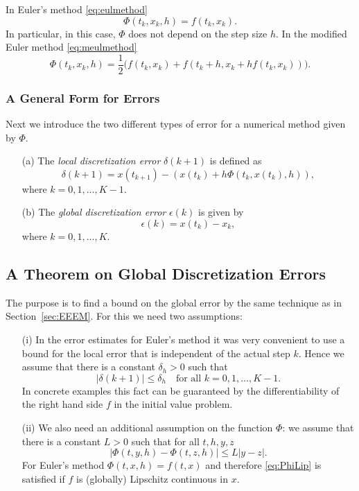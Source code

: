 \documentclass{ximera}
\begin{document}
In Euler's method \eqref{eq:eulmethod}
\[
\Phi(t_k,x_k,h)=f(t_k,x_k).
\]
In particular, in this case, $\Phi$ does not depend on the step size $h$.
In the modified Euler method \eqref{eq:meulmethod}
\[
\Phi(t_k,x_k,h) = \frac{1}{2}
\Big( f(t_k, x_k)+f(t_k+h, x_k + h f(t_k, x_k))\Big).
\]

\subsubsection*{A General Form for Errors}

Next we introduce the two different types of error for a numerical method
given by $\Phi$.
\begin{definition}
\label{def:errors}
\begin{itemize}
\item[(a)] 
The {\em local discretization error\/} $\delta(k+1)$ is defined as
\[
\delta(k+1) = x(t_{k+1}) - (x(t_k) + h\Phi(t_k,x(t_k),h)),
\]
where $k=0,1,\ldots,K-1$.
\item[(b)] 
The {\em global discretization error\/} $\epsilon(k)$ is given by
\[
\epsilon(k) = x(t_k)-x_k, 
\]
where $k=0,1,\ldots,K$.
\end{itemize}
\end{definition}

\subsection*{A Theorem on Global Discretization Errors}

The purpose is to find a bound on the global error by the same 
technique as in Section~\ref{sec:EEEM}.  For this we need two assumptions:
\begin{itemize}
\item[(i)] In the error estimates for Euler's method it was very convenient 
to use a bound for the local error that is independent of the actual 
step $k$.  Hence we assume that there is a constant $\delta_h>0$ such that
\begin{equation} \label{eq:locerrbound}
|\delta(k+1)| \le \delta_h \quad \mbox{for all $k=0,1,\ldots,K-1$.}
\end{equation}
In concrete examples this fact can be guaranteed by the differentiability
of the right hand side $f$ in the initial value problem.
\item[(ii)] We also need an additional assumption on the function $\Phi$:
we assume that there is a constant $L>0$ such that for all $t,h,y,z$
\begin{equation} \label{eq:PhiLip}
|\Phi(t,y,h)-\Phi(t,z,h)|\le L|y-z|.
\end{equation}
For Euler's method $\Phi(t,x,h)=f(t,x)$ and therefore \eqref{eq:PhiLip} is
satisfied if $f$ is (globally) Lipschitz 
continuous in $x$.
\end{itemize}
\end{document}
